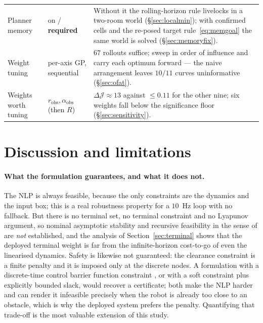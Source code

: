 \documentclass[11pt,a4paper]{article}
\newcommand{\aobs}{\alpha_{\mathrm{obs}}}
\newcommand{\robs}{r_{\mathrm{obs}}}
\begin{document}
\begin{table}[htbp]
\begin{tabular}{p{}p{}p{}}
    Planner memory & on / \textbf{required} & Without it the rolling-horizon rule livelocks in a two-room
      world (\S\ref{sec:localmin}); with confirmed cells and the re-posed target rule~\eqref{eq:memgoal}
      the same world is solved (\S\ref{sec:memoryfix}). \\
    Weight tuning & per-axis GP, sequential & $67$ rollouts suffice; sweep in order of influence and carry each
      optimum forward --- the naive arrangement leaves $10/11$ curves uninformative (\S\ref{sec:ofat}). \\
    Weights worth tuning & $\robs,\aobs$ (then $R$) & $\Delta\mathcal{J}\approx13$ against $\le0.11$ for the
      other nine; six weights fall below the significance floor (\S\ref{sec:sensitivity}). \\
    \bottomrule
  \end{tabular}
\end{table}

\section{Discussion and limitations}
\label{sec:discussion}

\paragraph{What the formulation guarantees, and what it does not.} The NLP is always feasible, because the
only constraints are the dynamics and the input box; this is a real robustness property for a $10$~Hz loop
with no fallback. But there is no terminal set, no terminal constraint and no Lyapunov argument, so nominal
asymptotic stability and recursive feasibility in the sense of
\cite{mayne2000constrained,chen1998quasi} are \emph{not} established, and the analysis of
Section~\ref{sec:terminal} shows that the deployed terminal weight is far from the infinite-horizon
cost-to-go of even the linearised dynamics. Safety is likewise not guaranteed: the clearance constraint is a
finite penalty and it is imposed only at the discrete nodes. A formulation with a discrete-time control
barrier function constraint \cite{ames2019cbf}, or with a soft constraint plus explicitly bounded slack,
would recover a certificate; both make the NLP harder and can render it infeasible precisely when the robot
is already too close to an obstacle, which is why the deployed system prefers the penalty. Quantifying that
trade-off is the most valuable extension of this study.
\end{document}
